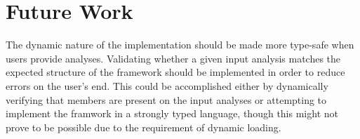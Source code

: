 \section{Future Work}

\newpar The dynamic nature of the implementation should be made more type-safe when users provide analyses. Validating whether a given input analysis matches the expected structure of the framework should be implemented in order to reduce errors on the user's end. This could be accomplished either by dynamically verifying that members are present on the input analyses or attempting to implement the framwork in a strongly typed language, though this might not prove to be possible due to the requirement of dynamic loading.